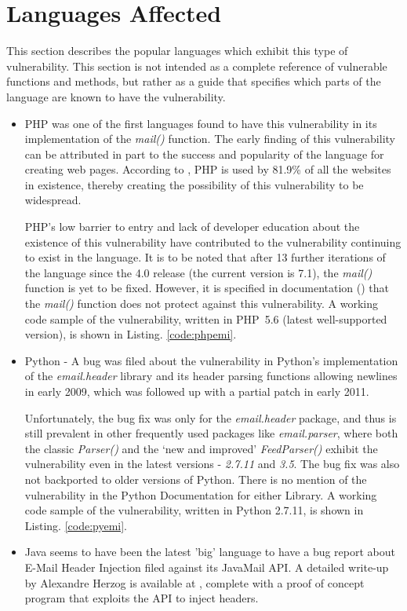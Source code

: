 \section{Languages Affected}

This section describes the popular languages which exhibit this type of vulnerability. This section is not intended as a complete reference of vulnerable functions and methods, but rather as a guide that specifies which parts of the language are known to have the vulnerability.
\begin{itemize}
	\item PHP was one of the first languages found to have this vulnerability in its implementation of the \emph{mail()} function. The early finding of this vulnerability can be attributed in part to the success and popularity of the language for creating web pages. According to \cite{W3techs}, PHP is used by 81.9\% of all the websites in existence, thereby creating the possibility of this vulnerability to be widespread. 
	
	PHP's low barrier to entry and lack of developer education about the existence of this vulnerability have contributed to the vulnerability continuing to exist in the language.
	It is to be noted that after 13 further iterations of the language since the 4.0 release (the current version is 7.1), the \emph{mail()} function is yet to be fixed. However, it is specified in documentation (\cite{PHPDocs}) that the \emph{mail()} function does not protect against this vulnerability.
	A working code sample of the vulnerability, written in PHP~5.6 (latest well-supported version), is shown in  Listing. \ref{code:phpemi}.
	
	
	
	
	\item Python - A bug was filed about the vulnerability in Python's implementation of the \emph{email.header} library and its header parsing functions allowing newlines in early 2009, which was followed up with a partial patch in early 2011. 
	
	Unfortunately, the bug fix was only for the \emph{email.header} package, and thus is still prevalent in other frequently used packages like \emph{email.parser}, where both the classic \emph{Parser()} and the `new and improved' \emph{FeedParser()} exhibit the vulnerability even in the latest versions - \emph{2.7.11} and \emph{3.5}. The bug fix was also not backported to older versions of Python. 
	There is no mention of the vulnerability in the Python Documentation for either Library.
	A working code sample of the vulnerability, written in Python 2.7.11, is shown in Listing. \ref{code:pyemi}.
	
	\item Java seems to have been the latest 'big' language to have a bug report about E-Mail Header Injection filed against its JavaMail API. A detailed write-up by Alexandre Herzog is available at \cite{Herzog.2014}, complete with a proof of concept program that exploits the API to inject headers.
	

\end{itemize}
